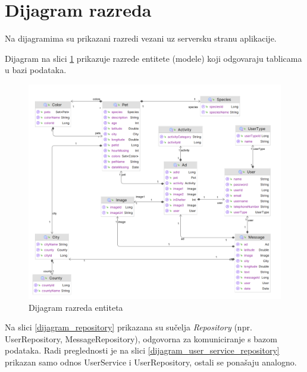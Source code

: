 			\eject
			
			
		\section{Dijagram razreda}

			Na dijagramima su prikazani razredi vezani uz serversku stranu aplikacije.
			
			Dijagram na slici \ref{dijagram_model} prikazuje razrede entitete (modele) koji odgovaraju tablicama u bazi podataka.
			
			\begin{figure}[H]
				\includegraphics[scale=0.3]{slike/dijagram_model.PNG} 
				\centering
				\caption{Dijagram razreda entiteta}
				\label{dijagram_model}
			\end{figure}
			
			Na slici \ref{dijagram_repository} prikazana su sučelja \textit{Repository} (npr. UserRepository, MessageRepository), odgovorna za komuniciranje s bazom podataka. Radi preglednosti je na slici \ref{dijagram_user_service_repository} prikazan samo odnos UserService i UserRepository, ostali se ponašaju analogno.
			
